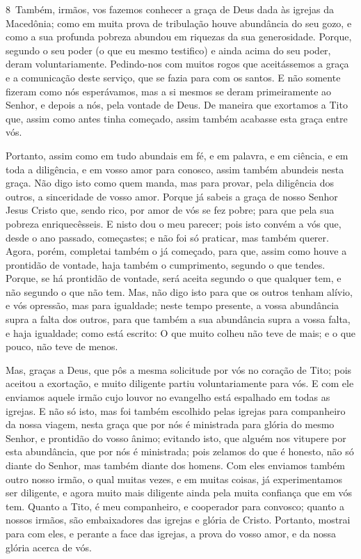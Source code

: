 \medskip

\lettrine{8}\ Também, irmãos, vos fazemos conhecer a graça de
Deus dada às igrejas da Macedônia; como em muita prova de
tribulação houve abundância do seu gozo, e como a sua profunda
pobreza abundou em riquezas da sua generosidade. Porque, segundo
o seu poder (o que eu mesmo testifico) e ainda acima do seu poder,
deram voluntariamente. Pedindo-nos com muitos rogos que
aceitássemos a graça e a comunicação deste serviço, que se fazia
para com os santos. E não somente fizeram como nós esperávamos,
mas a si mesmos se deram primeiramente ao Senhor, e depois a nós,
pela vontade de Deus. De maneira que exortamos a Tito que, assim
como antes tinha começado, assim também acabasse esta graça entre
vós.

Portanto, assim como em tudo abundais em fé, e em palavra, e em
ciência, e em toda a diligência, e em vosso amor para conosco, assim
também abundeis nesta graça. Não digo isto como quem manda, mas
para provar, pela diligência dos outros, a sinceridade de vosso
amor. Porque já sabeis a graça de nosso Senhor Jesus Cristo que,
sendo rico, por amor de vós se fez pobre; para que pela sua pobreza
enriquecêsseis. E nisto dou o meu parecer; pois isto convém a
vós que, desde o ano passado, começastes; e não foi só praticar, mas
também querer. Agora, porém, completai também o já começado,
para que, assim como houve a prontidão de vontade, haja também o
cumprimento, segundo o que tendes. Porque, se há prontidão de
vontade, será aceita segundo o que qualquer tem, e não segundo o que
não tem. Mas, não digo isto para que os outros tenham alívio,
e vós opressão, mas para igualdade; neste tempo presente, a
vossa abundância supra a falta dos outros, para que também a sua
abundância supra a vossa falta, e haja igualdade; como está
escrito: O que muito colheu não teve de mais; e o que pouco, não
teve de menos.

Mas, graças a Deus, que pôs a mesma solicitude por vós no coração
de Tito; pois aceitou a exortação, e muito diligente partiu
voluntariamente para vós. E com ele enviamos aquele irmão
cujo louvor no evangelho está espalhado em todas as igrejas.
E não só isto, mas foi também escolhido pelas igrejas para
companheiro da nossa viagem, nesta graça que por nós é ministrada
para glória do mesmo Senhor, e prontidão do vosso ânimo;
evitando isto, que alguém nos vitupere por esta abundância,
que por nós é ministrada; pois zelamos do que é honesto, não
só diante do Senhor, mas também diante dos homens. Com eles
enviamos também outro nosso irmão, o qual muitas vezes, e em muitas
coisas, já experimentamos ser diligente, e agora muito mais
diligente ainda pela muita confiança que em vós tem. Quanto a
Tito, é meu companheiro, e cooperador para convosco; quanto a nossos
irmãos, são embaixadores das igrejas e glória de Cristo.
Portanto, mostrai para com eles, e perante a face das
igrejas, a prova do vosso amor, e da nossa glória acerca de vós.

